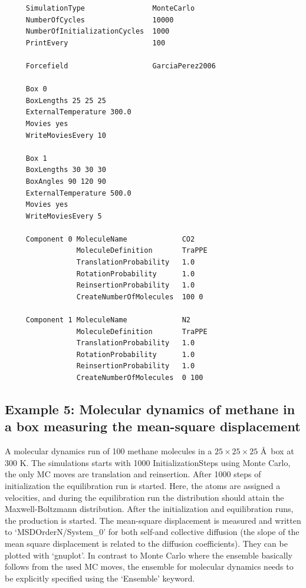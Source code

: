 \begin{tiny}
\begin{verbatim}
     SimulationType                MonteCarlo
     NumberOfCycles                10000
     NumberOfInitializationCycles  1000
     PrintEvery                    100
     
     Forcefield                    GarciaPerez2006
     
     Box 0
     BoxLengths 25 25 25
     ExternalTemperature 300.0
     Movies yes
     WriteMoviesEvery 10
     
     Box 1
     BoxLengths 30 30 30
     BoxAngles 90 120 90
     ExternalTemperature 500.0
     Movies yes
     WriteMoviesEvery 5
     
     Component 0 MoleculeName             CO2
                 MoleculeDefinition       TraPPE
                 TranslationProbability   1.0
                 RotationProbability      1.0
                 ReinsertionProbability   1.0
                 CreateNumberOfMolecules  100 0
     
     Component 1 MoleculeName             N2
                 MoleculeDefinition       TraPPE
                 TranslationProbability   1.0
                 RotationProbability      1.0
                 ReinsertionProbability   1.0
                 CreateNumberOfMolecules  0 100
\end{verbatim}
\end{tiny}


\subsection*{Example 5: Molecular dynamics of methane in a box measuring the mean-square displacement}
A molecular dynamics run of 100 methane molecules in a $25\times25\times25$ \AA\ box at 300 K.
The simulations starts with 1000 InitializationSteps using Monte Carlo, the only MC moves are translation and reinsertion.
After 1000 steps of initialization the equilibration run is started. Here, the atoms are assigned a velocities,
and during the equilibration run the distribution should attain the Maxwell-Boltzmann distribution.
After the initialization and equilibration runs, the production is started. The mean-square displacement is
measured and written to `MSDOrderN/System\_0' for both self-and collective diffusion (the slope of the mean square
displacement is related to the diffusion coefficients). They can be plotted with `gnuplot'.
In contrast to Monte Carlo where the ensemble basically follows from the used MC moves, the ensemble for molecular dynamics
needs to be explicitly specified using the `Ensemble' keyword.

